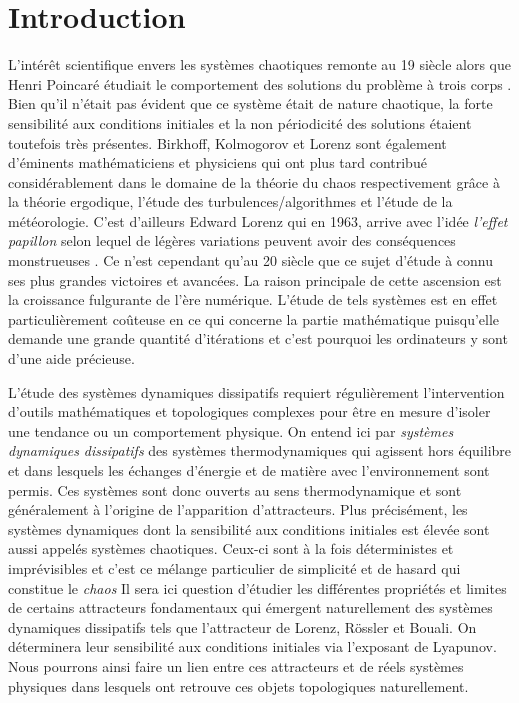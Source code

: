 \section{Introduction} \label{sec: introduction}

L'intérêt scientifique envers les systèmes chaotiques remonte au 19
siècle alors que Henri Poincaré étudiait le comportement des solutions du
problème à trois corps \cite{poin_carre}. Bien qu'il n'était pas évident que
ce système était de nature chaotique, la forte sensibilité aux conditions
initiales et la non périodicité des solutions étaient toutefois très présentes.
Birkhoff, Kolmogorov et Lorenz sont également d'éminents mathématiciens et
physiciens qui ont plus tard contribué considérablement dans le domaine de la
théorie du chaos respectivement grâce à la théorie ergodique, l'étude des
turbulences/algorithmes et l'étude de la météorologie. C'est d'ailleurs Edward
Lorenz qui en 1963, arrive avec l'idée \textit{l'effet papillon} selon lequel
de légères variations peuvent avoir des conséquences monstrueuses
\cite{butterfly}. Ce n'est cependant qu'au 20 siècle que ce sujet
d'étude à connu ses plus grandes victoires et avancées. La raison principale
de cette ascension est la croissance fulgurante de l'ère numérique. L'étude de
tels systèmes est en effet particulièrement coûteuse en ce qui concerne la
partie mathématique puisqu'elle demande une grande quantité d'itérations et
c'est pourquoi les ordinateurs y sont d'une aide précieuse.

L'étude des systèmes dynamiques dissipatifs requiert régulièrement
l'intervention d'outils mathématiques et topologiques complexes pour être en
mesure d'isoler une tendance ou un comportement physique. On entend ici par
\textit{systèmes dynamiques dissipatifs} des systèmes thermodynamiques qui
agissent hors équilibre et dans lesquels les échanges d'énergie et de matière
avec l'environnement sont permis. Ces systèmes sont donc ouverts au sens
thermodynamique et sont généralement à l'origine de l'apparition d'attracteurs.
Plus précisément, les systèmes dynamiques dont la sensibilité aux conditions
initiales est élevée sont aussi appelés systèmes chaotiques. Ceux-ci sont à la
fois déterministes et imprévisibles et c'est ce mélange particulier de
simplicité et de hasard qui constitue le \textit{chaos} Il sera ici question
d'étudier les différentes propriétés et limites de certains attracteurs
fondamentaux qui émergent naturellement des systèmes dynamiques dissipatifs
tels que l'attracteur de Lorenz, Rössler et Bouali. On déterminera leur
sensibilité aux conditions initiales via l'exposant de Lyapunov. Nous
pourrons ainsi faire un lien entre ces attracteurs et de réels systèmes
physiques dans lesquels ont retrouve ces objets topologiques naturellement.
